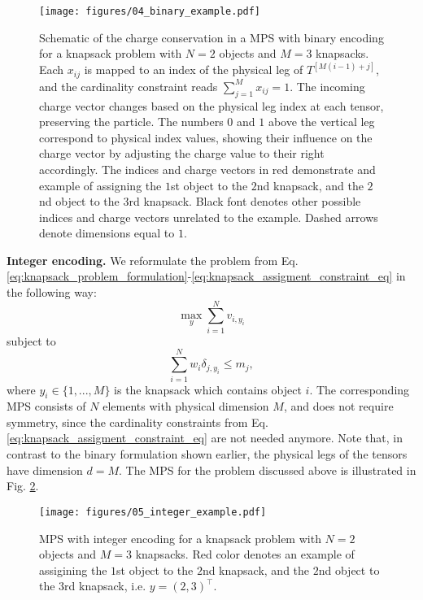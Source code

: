 \begin{figure}[!htbp]
    \centering
    \texttt{[image: figures/04\_binary\_example.pdf]}
    \caption{Schematic of the charge conservation in a MPS with binary encoding for a knapsack problem with $N=2$ objects and $M=3$ knapsacks. Each $x_{ij}$ is mapped to an index of the physical leg of $T^{[M(i-1)+j]}$, and the cardinality constraint reads $\sum_{j=1}^{M} x_{ij} = 1$. The incoming charge vector changes based on the physical leg index at each tensor, preserving the particle. The numbers $0$ and $1$ above the vertical leg correspond to physical index values, showing their influence on the charge vector by adjusting the charge value to their right accordingly. The indices and charge vectors in red demonstrate and example of assigning the $1$st object to the $2$nd knapsack, and the $2$nd object to the $3$rd knapsack. Black font denotes other possible indices and charge vectors unrelated to the example. Dashed arrows denote dimensions equal to $1$.
    }
    \label{fig:sym_mps_example}
\end{figure}
{\bf Integer encoding.}
We reformulate the problem from Eq. \eqref{eq:knapsack_problem_formulation}-\eqref{eq:knapsack_assigment_constraint_eq} in the following way:
\begin{equation}
    \max_y\sum_{i=1}^{N}v_{i,y_i}
\end{equation}
subject to
\begin{equation}\label{eq:knapsack_integer_ineq}
    \sum_{i=1}^{N}w_{i}\delta_{j, y_i}\leq m_{j},
\end{equation}
where $y_i\in\{1,...,M\}$ is the knapsack which contains object $i$.
The corresponding MPS consists of $N$ elements with physical dimension $M$, and does not require symmetry, since the cardinality constraints from Eq. \eqref{eq:knapsack_assigment_constraint_eq} are not needed anymore. Note that, in contrast to the binary formulation shown earlier, the physical legs of the tensors have dimension $d=M$. The MPS for the problem discussed above is illustrated in Fig. \ref{fig:nonsym_mps_example}.
\begin{figure}[!htbp]
    \centering
    \texttt{[image: figures/05\_integer\_example.pdf]}
    \caption{MPS with integer encoding for a knapsack problem with $N=2$ objects and $M=3$ knapsacks. Red color denotes an example of assigining the $1$st object to the $2$nd knapsack, and the $2$nd object to the $3$rd knapsack, i.e. $y=(2, 3)^\top$.}
    \label{fig:nonsym_mps_example}
\end{figure}

